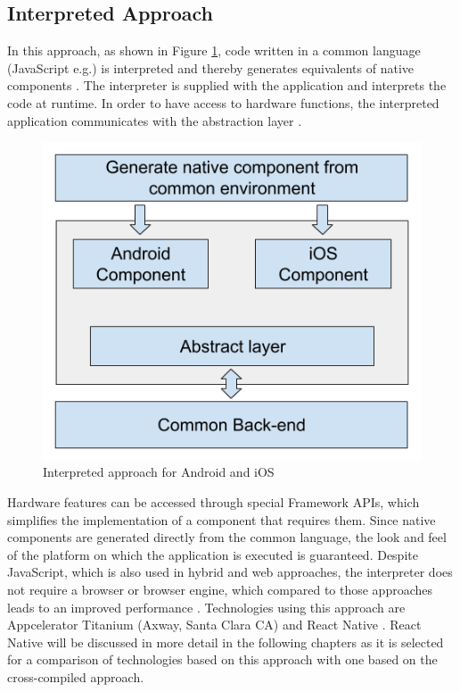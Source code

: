 \documentclass[Bachelor,BIF,english]{twbook}
\begin{document}
\subsection{Interpreted Approach}
In this approach, as shown in Figure \ref{Fig3}, code written in a common language (JavaScript e.g.) is interpreted and thereby generates equivalents of native components \cite[p.~3]{7479278}. The interpreter is supplied with the application and interprets the code at runtime. In order to have access to hardware functions, the interpreted application communicates with the abstraction layer \cite[p.~3]{7479278} \cite[p.~2]{7934674}.
\begin{figure}[!htbp]
\centering
\includegraphics[width=0.5\linewidth]{PICs/Interpreted.png}
\caption{Interpreted approach for Android and iOS \cite[p.~3]{7479278}}\label{Fig3}
\end{figure}
Hardware features can be accessed through special Framework APIs, which simplifies the implementation of a component that requires them. Since native components are generated directly from the common language, the look and feel of the platform on which the application is executed is guaranteed. Despite JavaScript, which is also used in hybrid and web approaches, the interpreter does not require a browser or browser engine, which compared to those approaches leads to an improved performance \cite[p.~627]{6420693} \cite[p.~3]{7479278}. Technologies using this approach are Appcelerator Titanium (Axway, Santa Clara CA) and React Native \cite[p.~2]{7934674} \cite[p.~3]{JohanssonSderberg2018}. React Native will be discussed in more detail in the following chapters as it is selected for a comparison of technologies based on this approach with one based on the cross-compiled approach.
\end{document}
